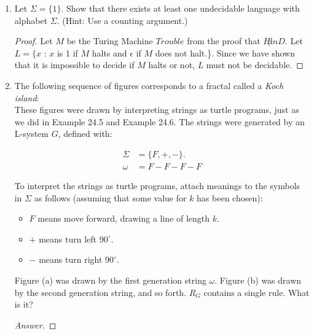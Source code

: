\documentclass[10pt]{article}
\begin{document}
\begin{enumerate}[1)]

\item
Let $\Sigma = \{1\}$.  Show that there exists at least one undecidable language with alphabet $\Sigma$.   (Hint: Use a counting argument.)
\begin{proof}[Proof]
Let $M$ be the Turing Machine $Trouble$ from the proof that $H \not in D$.  Let $L = \{x$ : $x$ is 1 if $M$ halts and $\epsilon$ if $M$ does not halt.\}.  Since we have shown that it is impossible to decide if $M$ halts or not, $L$ must not be decidable.
\end{proof}


\item
The following sequence of figures corresponds to a fractal called a \textit{Koch island}:\\


These figures were drawn by interpreting strings as turtle programs, just as we did in Example 24.5 and Example 24.6.  The strings were generated by an L-system $G$, defined with:

\begin{align*}
\Sigma &= \{F, +, -\}.\\
\omega &= F - F - F - F
\end{align*}

To interpret the strings as turtle programs, attach meanings to the symbols in $\Sigma$ as follows (assuming that some value for $k$ has been chosen):
\begin{itemize}
\item
$F$ means move forward, drawing a line of length $k$.
\item
$+$ means turn left $90^\circ$.
\item
$-$ means turn right $90^\circ$.
\end{itemize}

Figure (a) was drawn by the first generation string $\omega$.  Figure (b) was drawn by the second generation string, and so forth.  $R_G$ contains a single rule.  What is it?
\begin{proof}[Answer]
\end{proof}
\end{enumerate}
\end{document}
